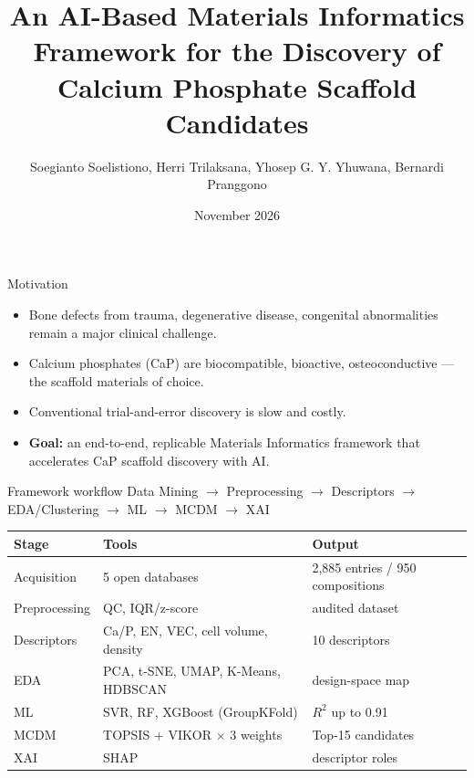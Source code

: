 \documentclass[10pt,aspectratio=169]{beamer}
\title{An AI-Based Materials Informatics Framework for the Discovery of Calcium Phosphate Scaffold Candidates}
\author[Soelistiono et al.]{Soegianto Soelistiono, Herri Trilaksana, Yhosep G. Y. Yhuwana, Bernardi Pranggono}
\institute[AMREC -- Universitas Airlangga]{Advanced Materials and Renewable Energy Conversion (AMREC)\\ Universitas Airlangga -- Anglia Ruskin University}
\date{November 2026}
\begin{document}
\begin{frame}
\titlepage
\end{frame}

\begin{frame}{Motivation}
\begin{itemize}
\item Bone defects from trauma, degenerative disease, congenital abnormalities remain a major clinical challenge.
\item Calcium phosphates (CaP) are biocompatible, bioactive, osteoconductive --- the scaffold materials of choice.
\item Conventional trial-and-error discovery is slow and costly.
\item \textbf{Goal:} an end-to-end, replicable Materials Informatics framework that accelerates CaP scaffold discovery with AI.
\end{itemize}
\end{frame}

\begin{frame}{Framework workflow}
\centering
Data Mining $\rightarrow$ Preprocessing $\rightarrow$ Descriptors $\rightarrow$ EDA/Clustering $\rightarrow$ ML $\rightarrow$ MCDM $\rightarrow$ XAI\\[2mm]
\begin{tabular}{lll}
\toprule
Stage & Tools & Output \\
\midrule
Acquisition & 5 open databases & 2{,}885 entries / 950 compositions \\
Preprocessing & QC, IQR/z-score & audited dataset \\
Descriptors & Ca/P, EN, VEC, cell volume, density & 10 descriptors \\
EDA & PCA, t-SNE, UMAP, K-Means, HDBSCAN & design-space map \\
ML & SVR, RF, XGBoost (GroupKFold) & $R^2$ up to 0.91 \\
MCDM & TOPSIS + VIKOR $\times$ 3 weights & Top-15 candidates \\
XAI & SHAP & descriptor roles \\
\bottomrule
\end{tabular}
\end{frame}
\end{document}
